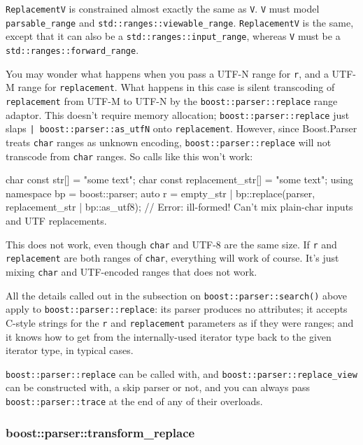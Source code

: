 \texttt{ReplacementV} is constrained almost exactly the same as \texttt{V}. \texttt{V} must model \texttt{parsable\_range} and \texttt{std::ranges::viewable\_range}. \texttt{ReplacementV} is the same, except that it can also be a \texttt{std::ranges::input\_range}, whereas \texttt{V} must be a \texttt{std::ranges::forward\_range}.

You may wonder what happens when you pass a UTF-N range for \texttt{r}, and a UTF-M range for \texttt{replacement}. What happens in this case is silent transcoding of \texttt{replacement} from UTF-M to UTF-N by the \texttt{boost::parser::replace} range adaptor. This doesn't require memory allocation; \texttt{boost::parser::replace} just slaps \texttt{| boost::parser::as\_utfN} onto \texttt{replacement}. However, since Boost.Parser treats \texttt{char} ranges as unknown encoding, \texttt{boost::parser::replace} will not transcode from \texttt{char} ranges. So calls like this won't work:

\begin{code}
char const str[] = "some text";
char const replacement_str[] = "some text";
using namespace bp = boost::parser;
auto r = empty_str | bp::replace(parser, replacement_str | bp::as_utf8); // Error: ill-formed!  Can't mix plain-char inputs and UTF replacements.
\end{code}

This does not work, even though \texttt{char} and UTF-8 are the same size. If \texttt{r} and \texttt{replacement} are both ranges of \texttt{char}, everything will work of course. It's just mixing \texttt{char} and UTF-encoded ranges that does not work.

All the details called out in the subsection on \texttt{boost::parser::search()} above apply to \texttt{boost::parser::replace}: its parser produces no attributes; it accepts C-style strings for the \texttt{r} and \texttt{replacement} parameters as if they were ranges; and it knows how to get from the internally-used iterator type back to the given iterator type, in typical cases.

\texttt{boost::parser::replace} can be called with, and \texttt{boost::parser::replace\_view} can be constructed with, a skip parser or not, and you can always pass \texttt{boost::parser::trace} at the end of any of their overloads.

\subsubsection{boost::parser::transform\_replace}


